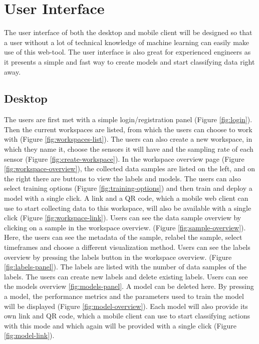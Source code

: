 \section{User Interface}
The user interface of both the desktop and mobile client will be designed so that a user without a lot of technical knowledge of machine learning can easily make use of this web-tool. The user interface is also great for experienced engineers as it presents a simple and fast way to create models and start classifying data right away.

\subsection{Desktop}
The users are first met with a simple login/registration panel (Figure \ref{fig:login}). Then the current workspaces are listed, from which the users can choose to work with (Figure \ref{fig:workspaces-list}). The users can also create a new \gls{workspace}, in which they name it, choose the \glspl{sensor} it will have and the sampling rate of each \gls{sensor} (Figure \ref{fig:create-workspace}). In the \gls{workspace} overview page  (Figure \ref{fig:workspace-overview}), the collected \glspl{data sample} are listed on the left, and on the right there are buttons to view the labels and models. The users can also select training options (Figure \ref{fig:training-options}) and then train and deploy a model with a single click. A link and a \gls{QR code}, which a mobile web client can use to start collecting data to this \gls{workspace}, will also be available with a single click (Figure \ref{fig:workspace-link}). Users can see the \gls{data sample} overview by clicking on a sample in the \gls{workspace} overview. (Figure \ref{fig:sample-overview}). Here, the users can see the \gls{metadata} of the sample, relabel the sample, select timeframes and choose a different visualization method. Users can see the labels overview by pressing the labels button in the \gls{workspace} overview. (Figure \ref{fig:labels-panel}). The labels are listed with the number of \glspl{data sample} of the labels. The users can create new labels and delete existing labels. Users can see the models overview \ref{fig:models-panel}. A model can be deleted here. By pressing a model, the performance metrics and the parameters used to train the model will be displayed (Figure \ref{fig:model-overview}). Each model will also provide its own link and \gls{QR code}, which a mobile client can use to start classifying actions with this mode and which again will be provided with a single click (Figure \ref{fig:model-link}).


